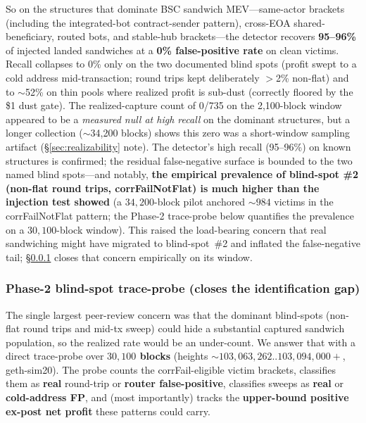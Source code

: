 \documentclass[11pt]{article}
\begin{document}
\noindent So on the structures that dominate BSC sandwich MEV---same-actor brackets
(including the integrated-bot contract-sender pattern), cross-EOA shared-beneficiary,
routed bots, and stable-hub brackets---the detector recovers \textbf{95--96\%} of
injected landed sandwiches at a \textbf{0\% false-positive rate} on clean victims.
Recall collapses to 0\% only on the two documented blind spots (profit swept to a cold
address mid-transaction; round trips kept deliberately $>$2\% non-flat) and to
$\sim$52\% on thin pools where realized profit is sub-dust (correctly floored by the
\$1 dust gate). The realized-capture count of 0/735 on the 2{,}100-block window appeared
to be a \emph{measured null at high recall} on the dominant structures, but a longer
collection ($\sim$34{,}200 blocks) shows this zero was a short-window sampling artifact
(\S\ref{sec:realizability} note). The detector's high recall (95--96\%) on known
structures is confirmed; the residual false-negative surface is bounded to the two named
blind spots---and notably, \textbf{the empirical prevalence of blind-spot \#2 (non-flat
round trips, corrFailNotFlat) is much higher than the injection test showed}
(a $34{,}200$-block pilot anchored $\sim$$984$ victims in the corrFailNotFlat pattern;
the Phase-2 trace-probe below quantifies the prevalence on a $30{,}100$-block window).
This raised the load-bearing concern that real sandwiching might have migrated to
blind-spot~\#2 and inflated the false-negative tail; \S\ref{sec:traceprobe} closes that
concern empirically on its window.

\subsubsection{Phase-2 blind-spot trace-probe (closes the identification gap)}
\label{sec:traceprobe}
The single largest peer-review concern was that the dominant blind-spots (non-flat
round trips and mid-tx sweep) could hide a substantial captured sandwich population,
so the realized rate would be an under-count. We answer that with a direct trace-probe
over \textbf{$30{,}100$ blocks} (heights $\sim$$103{,}063{,}262..103{,}094{,}000+$,
geth-sim20). The probe counts the corrFail-eligible victim brackets, classifies them
as \textbf{real} round-trip or \textbf{router false-positive}, classifies sweeps as
\textbf{real} or \textbf{cold-address FP}, and (most importantly) tracks the
\textbf{upper-bound positive ex-post net profit} these patterns could carry.
\end{document}
